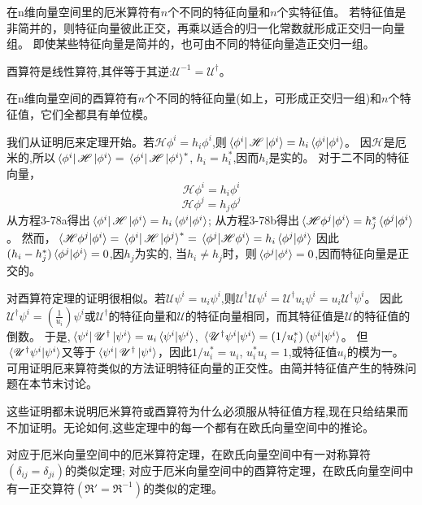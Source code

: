 \begin{theorem}
    在n维向量空间里的厄米算符有$n$个不同的特征向量和$n$个实特征值。
    若特征值是非简并的，则特征向量彼此正交，再乘以适合的归一化常数就形成正交归一向量组。
    即使某些特征向量是简并的，也可由不同的特征向量造正交归一组。
\end{theorem}

\begin{definition}[酉算符]
    酉算符是线性算符,其伴等于其逆:$\mathscr{U}^{-1}=\mathscr{U}^{\dagger}$。
\end{definition}

\begin{theorem}
    在n维向量空间的酉算符有$n$个不同的特征向量(如上，可形成正交归一组)和$n$个特征值，它们全都具有单位模。
\end{theorem}

我们从证明厄来定理开始。若$\mathscr{H}\phi^i=h_i\phi^i$,则$\bra*{\phi^i}\mathscr{H}\ket*{\phi^i}=h_i\bra*{\phi^i}\ket*{\phi^i}$。
因$\mathscr{H}$是厄米的,所以$\bra*{\phi^i}\mathscr{H}\ket*{\phi^i}=\bra*{\phi^i}\mathscr{H}\ket*{\phi^i}^*$, $h_i=h_i^*$,因而$h_i$是实的。
对于二不同的特征向量，
\[\mathscr{H}\phi^i=h_i\phi^i \tag{3-78a}\]
\[\mathscr{H}\phi^j=h_j\phi^j \tag{3-78a}\]
从方程3-78a得出$\bra*{\phi^i}\mathscr{H}\ket*{\phi^i}=h_i\bra*{\phi^i}\ket*{\phi^i}$;
从方程3-78b得出$\bra*{\mathscr{H}\phi^j}\ket*{\phi^i}=h_j^*\bra*{\phi^j}\ket*{\phi^i}$。
然而，$\bra*{\mathscr{H}\phi^j}\ket*{\phi^i}=\bra*{\phi^i}\mathscr{H}\ket*{\phi^j}^*=\bra*{\phi^j}\ket*{\mathscr{H}\phi^i}=h_i\bra*{\phi^j}\ket*{\phi^i}$
因此$(h_i-h_j^*)\bra*{\phi^j}\ket*{\phi^i}=0$,因$h_j$为实的,
当$h_i \neq h_j$时，则$\bra*{\phi^j}\ket*{\phi^i}=0$,因而特征向量是正交的。

对酉算符定理的证明很相似。若$\mathscr{U}\psi^i=u_i\psi^i$,则$\mathscr{U}^{\dagger}\mathscr{U}\psi^i=\mathscr{U}^{\dagger}u_i\psi^i=u_i\mathscr{U}^{\dagger}\psi^i$。
因此$\mathscr{U}^{\dagger}\psi^i=\left(\frac{1}{u_i}\right)\psi^i$或$\mathscr{U}^{\dagger}$的特征向量和$\mathscr{U}$的特征向量相同，而其特征值是$\mathscr{U}$的特征值的倒数。
于是,$\bra*{\psi^i}\mathscr{U}^{\dagger}\ket*{\psi^i}=u_i\bra*{\psi^i}\ket*{\psi^i}$, $\bra*{\mathscr{U}^{\dagger}\psi^i}\ket*{\psi^i}=(1/u_i^*)\bra*{\psi^i}\ket*{\psi^i}$。
但$\bra*{\mathscr{U}^{\dagger}\psi^i}\ket*{\psi^i}$又等于$\bra*{\psi^i}\mathscr{U}^{\dagger}\ket*{\psi^i}$，因此$1/u_i^*=u_i$, $u_i^*u_i=1$,或特征值$u_i$的模为一。
可用证明厄来算符类似的方法证明特征向量的正交性。由简并特征值产生的特殊问题在本节末讨论。

这些证明都未说明厄米算符或酉算符为什么必须服从特征值方程,现在只给结果而不加证明。无论如何,这些定理中的每一个都有在欧氏向量空间中的推论。
\begin{proposition}
    对应于厄米向量空间中的厄米算符定理，在欧氏向量空间中有一对称算符$(\delta_{ij}=\delta_{ji})$的类似定理;
    对应于厄米向量空间中的酉算符定理，在欧氏向量空间中有一正交算符$(\mathfrak{R}'=\mathfrak{R}^{-1})$的类似的定理。
\end{proposition}


